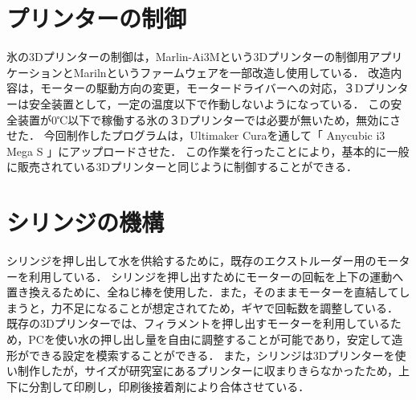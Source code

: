 \section{プリンターの制御}
\label{sec:paragraph}
氷の3Dプリンターの制御は，Marlin-Ai3Mという3Dプリンターの制御用アプリケーションとMarilnというファームウェアを一部改造し使用している．
改造内容は，モーターの駆動方向の変更，モータードライバーへの対応，３Dプリンターは安全装置として，一定の温度以下で作動しないようになっている．
この安全装置が0℃以下で稼働する氷の３Dプリンターでは必要が無いため，無効にさせた．
今回制作したプログラムは，Ultimaker Curaを通して「 Anycubic i3 Mega S 」にアップロードさせた．
この作業を行ったことにより，基本的に一般に販売されている3Dプリンターと同じように制御することができる．

\section{シリンジの機構}
\label{sec:paragraph}
シリンジを押し出して水を供給するために，既存のエクストルーダー用のモーターを利用している．
シリンジを押し出すためにモーターの回転を上下の運動へ置き換えるために、全ねじ棒を使用した．また，そのままモーターを直結してしまうと，力不足になることが想定されてため，ギヤで回転数を調整している．
既存の3Dプリンターでは、フィラメントを押し出すモーターを利用しているため，PCを使い水の押し出し量を自由に調整することが可能であり，安定して造形ができる設定を模索することができる．
また，シリンジは3Dプリンターを使い制作したが，サイズが研究室にあるプリンターに収まりきらなかったため，上下に分割して印刷し，印刷後接着剤により合体させている．

